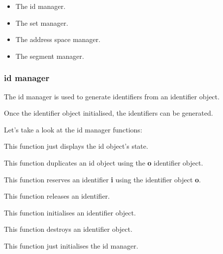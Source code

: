 \begin{itemize}
  \item
    The id manager.
  \item
    The set manager.
  \item
    The address space manager.
  \item
    The segment manager.
\end{itemize}

%
%

\subsubsection{id manager}

The id manager is used to generate identifiers from an identifier object.

Once the identifier object initialised, the identifiers can be generated.

Let's take a look at the id manager functions:


This function just displays the id object's state.


This function duplicates an id object using the \textbf{o} identifier
object.


This function reserves an identifier \textbf{i} using the identifier
object \textbf{o}.


This function releases an identifier.


This function initialises an identifier object.


This function destroys an identifier object.


This function just initialises the id manager.

